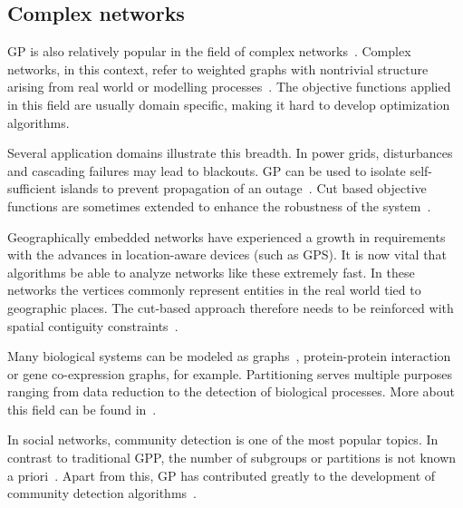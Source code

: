 \subsection{Complex networks}
GP is also relatively popular in the field of complex networks~\cite{buluc_recent_2016}. Complex networks, in this context, refer to weighted graphs with nontrivial structure arising from real world or modelling processes~\cite{newman_networks_2010}. The objective functions applied in this field are usually domain specific, making it hard to develop optimization algorithms. 

Several application domains illustrate this breadth. In power grids, disturbances and cascading failures may lead to blackouts. GP can be used to isolate self-sufficient islands to prevent propagation of an outage~\cite{li_strategic_2005}. Cut based objective functions are sometimes extended to enhance the robustness of the system~\cite{li_power_2009}.

Geographically embedded networks have experienced a growth in requirements with the advances in
location-aware devices (such as GPS). It is now vital that algorithms be able to analyze networks like these extremely fast. In these networks the vertices commonly represent entities in the real world tied to geographic places. The cut-based approach therefore needs to be reinforced with spatial contiguity constraints~\cite{li_power_2009, buluc_recent_2016}.

Many biological systems can be modeled as graphs~\cite{buluc_recent_2016}, protein-protein interaction or gene co-expression graphs, for example. Partitioning serves multiple purposes ranging from data reduction to the detection of biological processes. More about this field can be found in~\cite{noauthor_wiley_2008}. 

In social networks, community detection is one of the most popular topics. In contrast to traditional GPP, the number of subgroups or partitions is not known a priori~\cite{buluc_recent_2016}. Apart from this, GP has contributed greatly to the development of community detection algorithms~\cite{fortunato_community_2010, newman_community_2013}.

